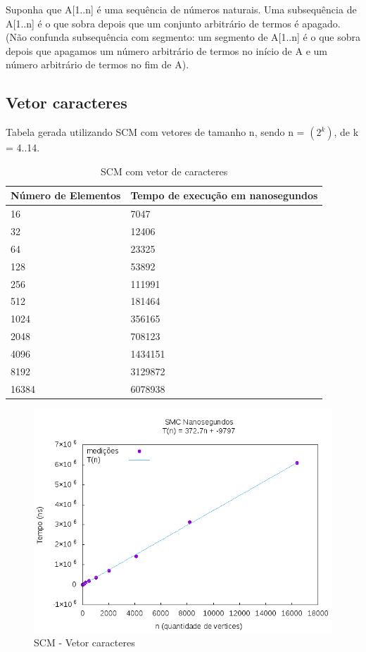 \documentclass[12pt,a4paper,twoside]{report}
\begin{document}
Suponha que A[1..n] é uma sequência de números naturais. Uma subsequência de A[1..n] é o que sobra depois que um conjunto arbitrário de termos é apagado.  (Não confunda subsequência com segmento: um segmento de A[1..n] é o que sobra depois que apagamos um número arbitrário de termos no início de A e um número arbitrário de termos no fim de A).

\subsection{Vetor caracteres}
Tabela gerada utilizando SCM com vetores de tamanho n, sendo n = $(2^k)$, de k = 4..14.
\begin{table}[H]
\centering
\caption{SCM com vetor de caracteres}
\label{my-label}
\begin{tabular}{|l|l|}
\hline
\multicolumn{1}{|c|}{\textbf{Número de Elementos}} & \multicolumn{1}{c|}{\textbf{Tempo de execução em nanosegundos}} \\ \hline
16 & 7047 \\ \hline
32 & 12406 \\ \hline
64 & 23325 \\ \hline
128 & 53892 \\ \hline
256 & 111991 \\ \hline
512 & 181464 \\ \hline
1024 & 356165 \\ \hline
2048 & 708123 \\ \hline
4096 & 1434151 \\ \hline
8192 & 3129872 \\ \hline
16384 & 6078938 \\ \hline

\end{tabular}
\end{table}

\begin{figure}[H]
    \centering
    \includegraphics[width=0.7\linewidth]{graficos/SMC Nanosegundos/SMCNanosegundos.png}
  \caption{SCM - Vetor caracteres}
\end{figure}
\end{document}
